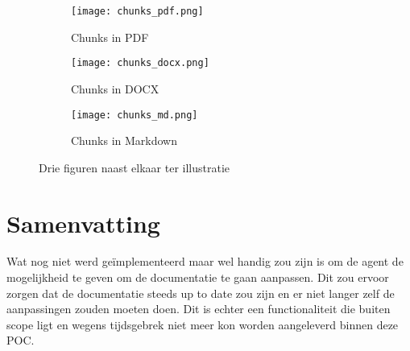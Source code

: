 \begin{figure}[H]
    \centering
    \begin{subfigure}{0.3\textwidth}
        \centering
        \texttt{[image: chunks\_pdf.png]}
        \caption{Chunks in PDF}
        \label{fig:chunks_pdf}
    \end{subfigure}
    \hfill
    \begin{subfigure}{0.3\textwidth}
        \centering
        \texttt{[image: chunks\_docx.png]}
        \caption{Chunks in DOCX}
        \label{fig:chunks_doc}
    \end{subfigure}
     \hfill
    \begin{subfigure}{0.3\textwidth}
        \centering
        \texttt{[image: chunks\_md.png]}
        \caption{Chunks in Markdown}
        \label{fig:chunks_md}
    \end{subfigure}
    \caption{Drie figuren naast elkaar ter illustratie}
    \label{fig:driefiguren}
\end{figure}



\section{Samenvatting}



Wat nog niet werd geïmplementeerd maar wel handig zou zijn is om de agent de mogelijkheid te geven om de documentatie te gaan aanpassen. Dit zou ervoor zorgen dat de documentatie steeds up to date zou zijn en er niet langer zelf de aanpassingen zouden moeten doen. Dit is echter een functionaliteit die buiten scope ligt en wegens tijdsgebrek niet meer kon worden aangeleverd binnen deze POC.